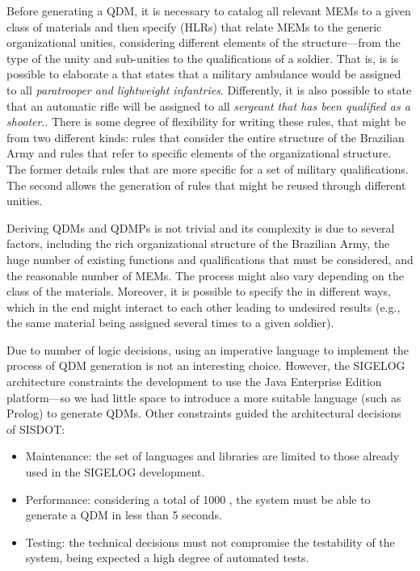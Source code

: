 Before generating a QDM, it is necessary to catalog all relevant MEMs to a given 
class of materials and then specify \callers (HLRs) that relate MEMs to the generic organizational 
unities, considering different elements of the structure---from the type of the unity and 
sub-unities to the qualifications of a soldier. {\color{red}That is, is is possible to elaborate a 
\shc that states that a military ambulance would be assigned to all \emph{paratrooper and lightweight infantries}. 
Differently, it is also possible to state that an automatic rifle will be assigned to all \emph{sergeant that has 
been qualified as a shooter}.}. There is some degree of flexibility for writing these 
rules, that might be from two different kinds: rules that consider the entire structure 
of the Brazilian Army and rules that refer to specific elements of the organizational 
structure. The former details rules that are more specific for a set of military qualifications. The second allows 
the generation of rules that might be reused through different unities. 

Deriving QDMs and QDMPs is not trivial and its complexity is due to several 
factors, including the rich organizational structure of the Brazilian Army, 
the huge number of existing functions and qualifications that must be 
considered, and the reasonable number of MEMs. The process might also vary 
depending on the class of the materials. Moreover, it is possible to specify the  
\callers in different ways, which in the end might interact to each other leading 
to undesired results (e.g., the same material being assigned several times 
to a given soldier). 

Due to number of logic decisions, using an imperative language to implement the process of QDM generation 
is not an interesting choice. However, the SIGELOG architecture constraints the development 
to use the Java Enterprise Edition platform---so we had little space to introduce a 
more suitable language (such as Prolog) to generate QDMs. Other constraints guided 
the architectural decisions of SISDOT:  

\begin{itemize}
\item Maintenance: the set of languages and libraries are limited to those already used in the SIGELOG development.  
\item Performance: considering a total of 1000 \callers, the system must be able to generate a QDM in less than 5 seconds.
\item Testing: the technical decisions must not compromise the testability of the system, being expected a high degree of automated tests. 
\end{itemize}


